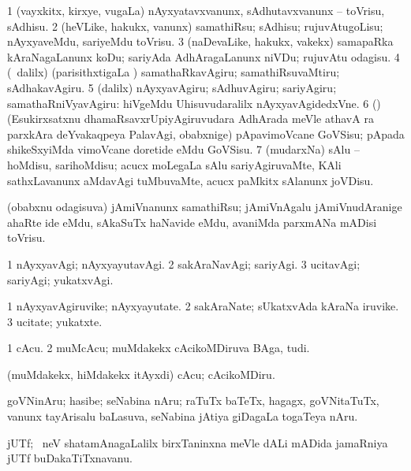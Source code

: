 \bentry
{}
\gl{\sakirx}
\bmng
\bnum
\num{1} (vayxkitx, kirxye, \mo vugaLa) nAyxyatavxvanunx, sAdhutavxvanunx -- toVrisu, sAdhisu. 
\num{2} (heVLike, hakukx, \mo vanunx) samathiRsu; sAdhisu; rujuvAtugoLisu; nAyxyaveMdu, sariyeMdu toVrisu. 
\num{3} (naDevaLike, hakukx, \mo vakekx) samapaRka kAraNagaLanunx koDu; sariyAda AdhAragaLanunx niVDu; rujuvAtu odagisu. 
\num{4} (\kanmu\ \kaparx dalilx) (parisithxtigaLa \vi) samathaRkavAgiru; samathiRsuvaMtiru; sAdhakavAgiru. 
\num{5} (\BUkaq dalilx) nAyxyavAgiru; sAdhuvAgiru; sariyAgiru; samathaRniVyavAgiru:  hiVgeMdu Uhisuvudaralilx nAyxyavAgidedxVne. 
\num{6} (\deVva) (Esukirxsatxnu dhamaRsavxrUpiyAgiruvudara AdhArada meVle athavA \roVkAyx ra parxkAra deYvakaqpeya PalavAgi, obabxnige) pApavimoVcane GoVSisu; pApada shikeSxyiMda vimoVcane doretide eMdu GoVSisu. 
\num{7} (mudarxNa) sAlu -- hoMdisu, sarihoMdisu; acucx moLegaLa sAlu sariyAgiruvaMte, KAli sathxLavanunx aMdavAgi tuMbuvaMte, acucx paMkitx sAlanunx joVDisu. 
\enum
\emng

\noindent
\gl{\pagu}
\bmng
{} (obabxnu odagisuva) jAmiVnanunx samathiRsu; jAmiVnAgalu jAmiVnudAranige ahaRte ide eMdu, sAkaSuTx haNavide eMdu, avaniMda parxmANa mADisi toVrisu. 
\emng
\eentry

\bentry
{}
\gl{\kirxvi}
\bmng
\bnum
\num{1} nAyxyavAgi; nAyxyayutavAgi. 
\num{2} sakAraNavAgi; sariyAgi. 
\num{3} ucitavAgi; sariyAgi; yukatxvAgi. 
\enum
\emng
\eentry

\bentry
{}
\gl{\nA}
\bmng
\bnum
\num{1} nAyxyavAgiruvike; nAyxyayutate. 
\num{2} sakAraNate; sUkatxvAda kAraNa iruvike. 
\num{3} ucitate; yukatxte. 
\enum
\emng
\eentry

\bentry
{}
\gl{\nA}
\bmng
\bnum
\num{1} cAcu. 
\num{2} muMcAcu; muMdakekx cAcikoMDiruva BAga, tudi. 
\enum
\emng
\eentry

\bentry
{}
\gl{\akirx}
\bmng
(muMdakekx, hiMdakekx itAyxdi) cAcu; cAcikoMDiru. 
\emng
\eentry

\bentry
{}
\gl{\nA}
\bmng
goVNinAru; hasibe; seNabina nAru; raTuTx baTeTx, hagagx, goVNitaTuTx, \mo vanunx tayArisalu baLasuva, seNabina jAtiya giDagaLa togaTeya nAru. 
\emng
\eentry

\bentry
{}
\gl{\nA}
\bmng
jUTf; \kirxsha\ neV shatamAnagaLalilx birxTaninxna meVle dALi mADida jamaRniya jUTf buDakaTiTxnavanu. 
\emng
\eentry

